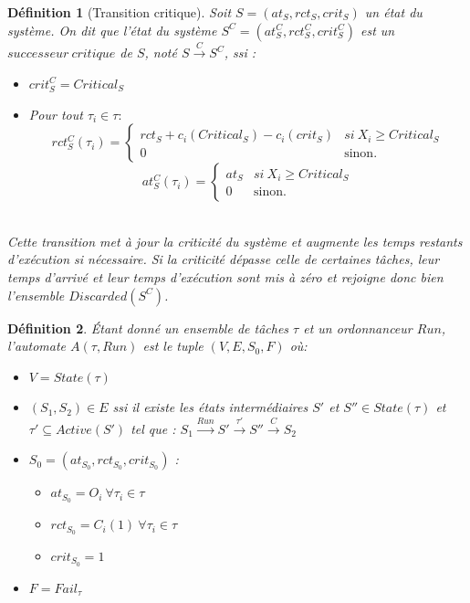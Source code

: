 \documentclass[a4paper]{report}
\theoremstyle{break}
\newtheorem{defin}{Définition}
\begin{document}
\begin{defin}[Transition critique]
Soit $S = (at_S, rct_S, crit_S)$ un état du système. On dit que l'état du système $S^C = (at_S^C, rct_S^C, crit_S^C)$ est un $successeur\ critique$ de $S$, noté $S\xrightarrow{C}S^C$, ssi :
\begin{itemize}
\item $crit_S^C = Critical_S$
\item Pour tout $\tau_i \in \tau :$
$$ rct_S^C(\tau_i) = \left\{
    \begin{array}{ll}
        rct_S+c_i(Critical_S)-c_i(crit_S) & si\ X_i\geq Critical_S \\
        0 & \mbox{sinon.}
    \end{array}
\right.
$$
$$ at_S^C(\tau_i) = \left\{
    \begin{array}{ll}
        at_S & si\ X_i\geq Critical_S \\
        0 & \mbox{sinon.}
    \end{array}
\right.
$$\\
\end{itemize}
Cette transition met à jour la criticité du système et augmente les temps restants d'exécution si nécessaire. Si la criticité dépasse celle de certaines tâches, leur temps d'arrivé et leur temps d'exécution sont mis à zéro et rejoigne donc bien l'ensemble $Discarded(S^C)$.
\end{defin}

\begin{defin} Étant donné un ensemble de tâches $\tau$ et un ordonnanceur $Run$, l'automate $A(\tau,Run)$ est le tuple $(V, E, S_0, F)$ où:
\begin{itemize}
\item  $V=State(\tau)$
\item $(S_1,S_2) \in E$ ssi il existe les états intermédiaires $S'$ et $S'' \in State(\tau)$ et $\tau' \subseteq Active(S') $ tel que : $S_1\xrightarrow{Run}S'\xrightarrow{\tau'}S''\xrightarrow{C}S_2$
\item $S_0 = (at_{S_0}, rct_{S_0}, crit_{S_0})$ :\begin{itemize}
\item $at_{S_0} = O_i\ \forall \tau_i \in \tau$
\item $rct_{S_0} = C_i(1)\ \forall \tau_i \in \tau$
\item $crit_{S_0} = 1$
\end{itemize}
\item $F = Fail_\tau$
\end{itemize}

\end{defin} 







%

\end{document}
